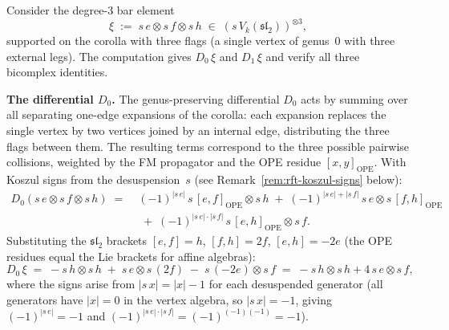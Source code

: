 \begin{example}
\label{ex:rft-sl2hat}
Consider the degree-$3$ bar element
\[
\xi \;:=\; s\,e \otimes s\,f \otimes s\,h
\;\in\; (s\, V_k(\mathfrak{sl}_2))^{\otimes 3},
\]
supported on the corolla with three flags (a single vertex of
genus~$0$ with three external legs). The computation gives $D_0\,\xi$
and $D_1\,\xi$ and verify all three bicomplex identities.

\medskip\noindent
\textbf{The differential $D_0$.}
The genus-preserving differential $D_0$ acts by summing over
all separating one-edge expansions of the corolla: each
expansion replaces the single vertex by two vertices joined
by an internal edge, distributing the three flags between
them. The resulting terms correspond to the three possible
pairwise collisions, weighted by the FM propagator and the
OPE residue $[x,y]_{\mathrm{OPE}}$. With Koszul signs from
the desuspension~$s$ (see Remark~\ref{rem:rft-koszul-signs}
below):
\begin{align*}
D_0(s\,e \otimes s\,f \otimes s\,h)
\;=\;&
(-1)^{|s\,e|}\, s\,[e,f]_{\mathrm{OPE}} \otimes s\,h
\;+\;
(-1)^{|s\,e|+|s\,f|}\, s\,e \otimes s\,[f,h]_{\mathrm{OPE}}
\\
&\;+\;
(-1)^{|s\,e| \cdot |s\,f|}\,
s\,[e,h]_{\mathrm{OPE}} \otimes s\,f.
\end{align*}
Substituting the $\mathfrak{sl}_2$ brackets
$[e,f] = h$, $[f,h] = 2f$, $[e,h] = -2e$
(the OPE residues equal the Lie brackets for affine algebras):
\begin{equation}\label{eq:D0-sl2}
D_0\,\xi
\;=\;
-s\,h \otimes s\,h
\;+\; s\,e \otimes s\,(2f)
\;-\; s\,(-2e) \otimes s\,f
\;=\;
-s\,h \otimes s\,h
+ 4\, s\,e \otimes s\,f,
\end{equation}
where the signs arise from $|s\,x| = |x| - 1$ for each
desuspended generator (all generators have $|x| = 0$ in the
vertex algebra, so $|s\,x| = -1$, giving
$(-1)^{|s\,e|} = -1$ and
$(-1)^{|s\,e| \cdot |s\,f|} = (-1)^{(-1)(-1)} = -1$).


\end{example}
